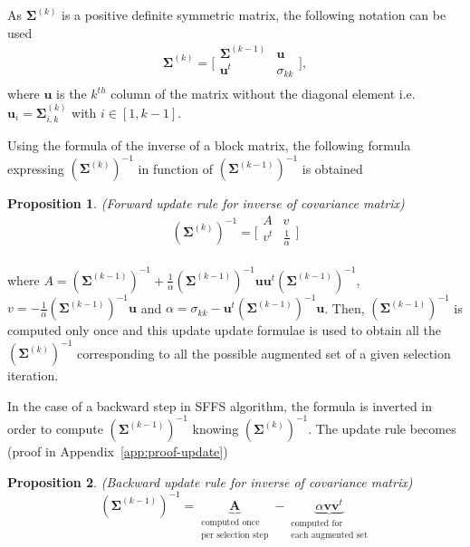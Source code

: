 \documentclass[journal,peerreview,onecolumn]{IEEEtran}
\newtheorem{prop}{Proposition}
\begin{document}
        As $\boldsymbol{\Sigma}^{(k)}$ is a positive definite symmetric matrix, the following notation can be used
        \begin{equation*}
            \boldsymbol{\Sigma}^{(k)} =
            \bigg[\begin{array}{cc}
            \boldsymbol{\Sigma}^{(k-1)} & \mathbf{u}      \\
            \mathbf{u}^t          & \sigma_{kk} \\
            \end{array}\bigg],
        \end{equation*}
        where $\mathbf{u}$ is the $k^{th}$ column of the matrix without the diagonal element i.e. $\mathbf{u}_{i} = \boldsymbol{\Sigma}^{(k)}_{i,k}$ with $i \in [1,k-1]$.

        Using the formula of the inverse of a block matrix, the following formula expressing $(\boldsymbol{\Sigma}^{(k)})^{-1}$ in function of $(\boldsymbol{\Sigma}^{(k-1)})^{-1}$ is obtained
        \begin{prop}
        \label{eq:update-inv}
            (Forward update rule for inverse of covariance matrix)
            \begin{equation*}
                (\boldsymbol{\Sigma}^{(k)})^{-1} =
                \bigg[\begin{array}{cc}
                A & v \\
                v^t  & \frac{1}{\alpha} \\
                \end{array}\bigg]
            \end{equation*}
        \end{prop}
        where $A = (\boldsymbol{\Sigma}^{(k-1)})^{-1} + \frac{1}{\alpha} (\boldsymbol{\Sigma}^{(k-1)})^{-1} \mathbf{u} \mathbf{u}^t (\boldsymbol{\Sigma}^{(k-1)})^{-1}$, $v = - \frac{1}{\alpha} (\boldsymbol{\Sigma}^{(k-1)})^{-1} \mathbf{u}$ and $ \alpha = \sigma_{kk} - \mathbf{u}^t (\boldsymbol{\Sigma}^{(k-1)})^{-1} \mathbf{u}$. Then, $(\boldsymbol{\Sigma}^{(k-1)})^{-1}$ is computed only once and this update update formulae is used to obtain all the $(\boldsymbol{\Sigma}^{(k)})^{-1}$ corresponding to all the possible augmented set of a given selection iteration.

        In the case of a backward step in SFFS algorithm, the formula is inverted in order to compute $(\boldsymbol{\Sigma}^{(k-1)})^{-1}$ knowing $(\boldsymbol{\Sigma}^{(k)})^{-1}$. The update rule becomes (proof in Appendix~\ref{app:proof-update})
        \begin{prop}
        \label{eq:update-inv-back}
            (Backward update rule for inverse of covariance matrix)
            \begin{equation*}
                (\boldsymbol{\Sigma}^{(k-1)})^{-1} = \underbrace{\mathbf{A}}_{\substack{\text{computed once}\\ \text{per selection step}}} - \underbrace{\alpha \mathbf{v} \mathbf{v}^t}_{\substack{\text{computed for} \\ \text{each augmented set}}}
            \end{equation*}
        \end{prop}
\end{document}
